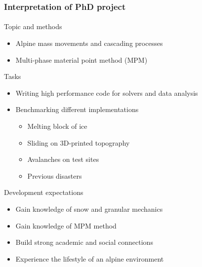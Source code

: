 \documentclass[
	10pt, %
]{beamer}
\begin{document}
\begin{frame}
	\frametitle{Interpretation of PhD project}
	\framesubtitle{}

	{\large Topic and methods}
	\begin{itemize}
		\item Alpine mass movements and cascading processes
		\item Multi-phase material point method (MPM)
	\end{itemize}
	\vspace*{7px}
	
	{\large Tasks}
	\begin{itemize}
		\item Writing high performance code for solvers and data analysis
		\item Benchmarking different implementations
		\begin{itemize}
			\item Melting block of ice
			\item Sliding on 3D-printed topography
			\item Avalanches on test sites
			\item Previous disasters
		\end{itemize}
	\end{itemize}
	\vspace*{7px}
	
	
	{\large Development expectations}
	\begin{itemize}
		\item Gain knowledge of snow and granular mechanics
		\item Gain knowledge of MPM method
		\item Build strong academic and social connections
		\item Experience the lifestyle of an alpine environment
	\end{itemize}

	

	







	
\end{frame}
\end{document}

